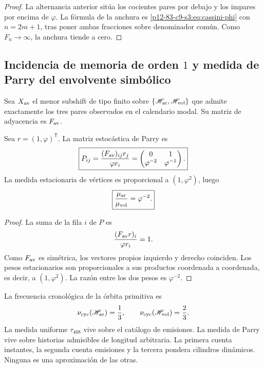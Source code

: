 \begin{proof}
La alternancia anterior sitúa los cocientes pares por debajo y los impares
por encima de \(\varphi\). La fórmula de la anchura es
\eqref{p12-83-c9-s3:eq:cassini-phi} con \(n=2m+1\), tras poner ambas fracciones sobre
denominador común. Como \(F_n\to\infty\), la anchura tiende a cero.
\end{proof}

\subsection{Incidencia de memoria de orden \(1\) y medida de Parry del envolvente simbólico}

Sea \(X_{\rm av}\) el menor subshift de tipo finito sobre
\(\{\mathscr H_{\rm ar},\mathscr H_{\rm vol}\}\) que admite exactamente
los tres pares observados en el calendario modal. Su matriz de adyacencia es
\(F_{\rm av}\).

\begin{theorem}
\label{p12-83-c9-s3:thm:parry-phi}
Sea \(r=(1,\varphi)^{\mathsf T}\). La matriz estocástica de Parry es
\begin{equation}
 \boxed{
 P_{ij}=
 \frac{(F_{\rm av})_{ij}r_j}{\varphi r_i}
 =
 \begin{pmatrix}
 0&1\\
 \varphi^{-2}&\varphi^{-1}
 \end{pmatrix}.}
 \label{p12-83-c9-s3:eq:parry-matriz-phi}
\end{equation}
La medida estacionaria de vértices es proporcional a
\((1,\varphi^2)\), luego
\begin{equation}
 \boxed{
 \frac{\mu_{\rm ar}}{\mu_{\rm vol}}=\varphi^{-2}.}
 \label{p12-83-c9-s3:eq:parry-razon-phi}
\end{equation}
\end{theorem}

\begin{proof}
La suma de la fila \(i\) de \(P\) es
\[
 \frac{(F_{\rm av}r)_i}{\varphi r_i}=1.
\]
Como \(F_{\rm av}\) es simétrica, los vectores propios izquierdo y derecho
coinciden. Los pesos estacionarios son proporcionales a sus productos
coordenada a coordenada, es decir, a \((1,\varphi^2)\). La razón entre los
dos pesos es \(\varphi^{-2}\).
\end{proof}

\begin{remark}
La frecuencia cronológica de la órbita primitiva es
\[
 \nu_{\rm cyc}(\mathscr H_{\rm ar})=\frac13,
 \qquad
 \nu_{\rm cyc}(\mathscr H_{\rm vol})=\frac23.
\]
La medida uniforme \(\tau_{468}\) vive sobre el catálogo de emisiones. La
medida de Parry vive sobre historias admisibles de longitud arbitraria. La
primera cuenta instantes, la segunda cuenta emisiones y la tercera pondera
cilindros dinámicos. Ninguna es una aproximación de las otras.
\end{remark}

